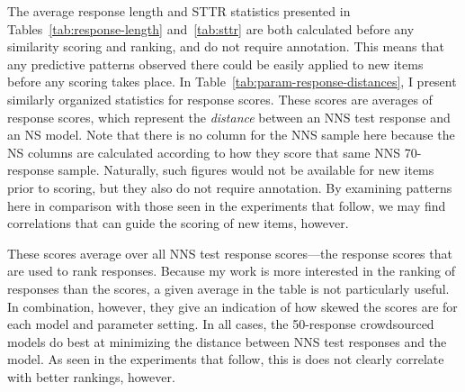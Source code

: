 
The average response length and STTR statistics presented in Tables~\ref{tab:response-length} and~\ref{tab:sttr} are both calculated before any similarity scoring and ranking, and do not require annotation. This means that any predictive patterns observed there could be easily applied to new items before any scoring takes place. In Table~\ref{tab:param-response-distances}, I present similarly organized statistics for response scores. These scores are averages of response scores, which represent the \textit{distance} between an NNS test response and an NS model. Note that there is no column for the NNS sample here because the NS columns are calculated according to how they score that same NNS 70-response sample. Naturally, such figures would not be available for new items prior to scoring, but they also do not require annotation. By examining patterns here in comparison with those seen in the experiments that follow, we may find correlations that can guide the scoring of new items, however.

These scores average over all NNS test response scores---the response scores that are used to rank responses. Because my work is more interested in the ranking of responses than the scores, a given average in the table is not particularly useful. In combination, however, they give an indication of how skewed the scores are for each model and parameter setting. In all cases, the 50-response crowdsourced models do best at minimizing the distance between NNS test responses and the model. As seen in the experiments that follow, this is does not clearly correlate with better rankings, however.


